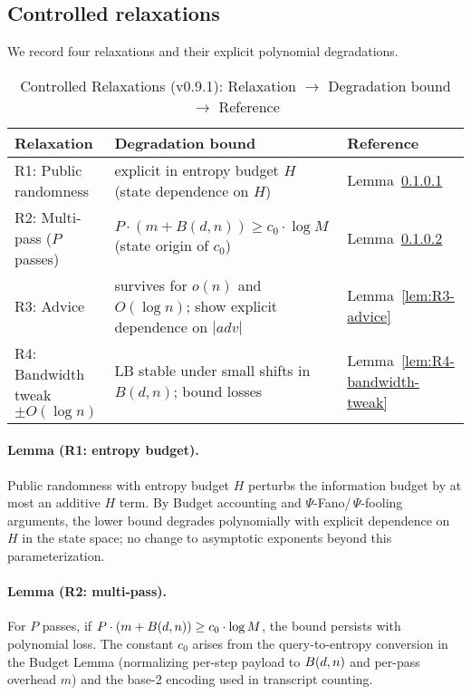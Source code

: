 \subsection{Controlled relaxations}
We record four relaxations and their explicit polynomial degradations.

\begin{table}[t]
\centering
\caption{Controlled Relaxations (v0.9.1): Relaxation $\to$ Degradation bound $\to$ Reference}
\begin{tabular}{lll}
\toprule
Relaxation & Degradation bound & Reference \\
\midrule
R1: Public randomness & explicit in entropy budget $H$ (state dependence on $H$) & Lemma~\ref{lem:R1-entropy-budget} \\
R2: Multi-pass ($P$ passes) & $P\cdot(m+B(d,n)) \ge c_0\cdot \log M$ (state origin of $c_0$) & Lemma~\ref{lem:R2-multipass} \\
R3: Advice & survives for $o(n)$ and $O(\log n)$; show explicit dependence on $|adv|$ & Lemma~\ref{lem:R3-advice} \\
R4: Bandwidth tweak $\pm O(\log n)$ & LB stable under small shifts in $B(d,n)$; bound losses & Lemma~\ref{lem:R4-bandwidth-tweak} \\
\bottomrule
\end{tabular}
\end{table}

\paragraph{Lemma (R1: entropy budget).}\label{lem:R1-entropy-budget}
Public randomness with entropy budget $H$ perturbs the information budget by at most an additive $H$ term. By Budget accounting and $\Psi$-Fano/\,$\Psi$-fooling arguments, the lower bound degrades polynomially with explicit dependence on $H$ in the state space; no change to asymptotic exponents beyond this parameterization.

\paragraph{Lemma (R2: multi-pass).}\label{lem:R2-multipass}
For $P$ passes, if $P\cdot(m+\B(d,n)) \ge c_0\cdot \log M$, the bound persists with polynomial loss. The constant $c_0$ arises from the query-to-entropy conversion in the Budget Lemma (normalizing per-step payload to $\B(d,n)$ and per-pass overhead $m$) and the base-2 encoding used in transcript counting.

